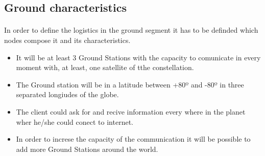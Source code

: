 \subsection{Ground characteristics}

\paragraph{}
In order to define the logistics in the ground segment it has to be definded which nodes compose it and its characteristics.
\begin{itemize}
\item It will be at least 3 Ground Stations with the capacity to comunicate in every moment with, at least, one satellite of tthe constellation. 
\item The Ground station will be in a latitude between +80º and -80º in three separated longiudes of the globe.
\item The client could ask for and recive information every where in the planet wher he/she could conect to internet. 
\item In order to increse the capacity of the communication it will be possible to add more Ground Stations around the world.
\end{itemize}
